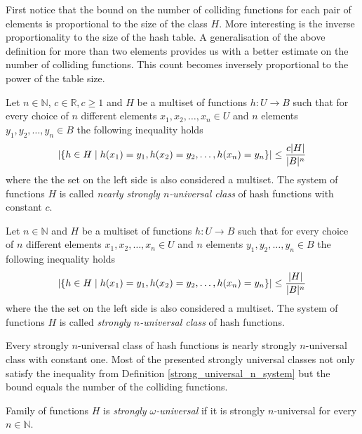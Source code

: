 First notice that the bound on the number of colliding functions for each pair of elements is proportional to the size of the class $H$. More interesting is the inverse proportionality to the size of the hash table. A generalisation of the above definition for more than two elements provides us with a better estimate on the number of colliding functions. This count becomes inversely proportional to the power of the table size.

\begin{definition}
\label{nearly_strong_universal_n_system}
Let $n \in \mathbb{N}$, $c \in \mathbb{R}, c \geq 1$ and $H$ be a multiset of functions $h: U \rightarrow B$ such that for every choice of $n$ different elements $x_1, x_2, \dots, x_n \in U$ and $n$ elements $y_1, y_2, \dots, y_n \in B$ the following inequality holds
\[ 
	\left|\lbrace h \in H \mid h(x_1) = y_1, h(x_2) = y_2, \dots, h(x_n) = y_n \rbrace \right| \leq \frac{c|H|}{|B|^n}
\] 
where the the set on the left side is also considered a multiset. The system of functions $H$ is called \emph{nearly strongly $n$-universal class} of hash functions with constant $c$.
\end{definition}

\begin{definition}
\label{strong_universal_n_system}
Let $n \in \mathbb{N}$ and $H$ be a multiset of functions $h: U \rightarrow B$ such that for every choice of $n$ different elements $x_1, x_2, \dots, x_n \in U$ and $n$ elements $y_1, y_2, \dots, y_n \in B$ the following inequality holds
\[ 
	\left|\lbrace h \in H \mid h(x_1) = y_1, h(x_2) = y_2, \dots, h(x_n) = y_n \rbrace \right| \leq \frac{|H|}{|B|^n}
\] 
where the the set on the left side is also considered a multiset. The system of functions $H$ is called \emph{strongly $n$-universal class} of hash functions.
\end{definition}

Every strongly $n$-universal class of hash functions is nearly strongly $n$-universal class with constant one. Most of the presented strongly universal classes not only satisfy the inequality from Definition \ref{strong_universal_n_system} but the bound equals the number of the colliding functions.

\begin{definition}
\label{strong_universal_omega_system}
Family of functions $H$ is \emph{strongly $\omega$-universal} if it is strongly $n$-universal for every $n \in \mathbb{N}$.
\end{definition}

